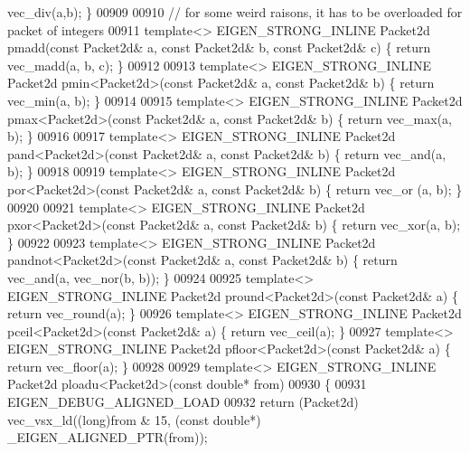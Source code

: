 \begin{DoxyCode}
{      vec\_div(a,b); \}
00909 
00910 \textcolor{comment}{// for some weird raisons, it has to be overloaded for packet of integers}
00911 \textcolor{keyword}{template}<> EIGEN\_STRONG\_INLINE Packet2d pmadd(\textcolor{keyword}{const} Packet2d& a, \textcolor{keyword}{const} Packet2d& b, \textcolor{keyword}{const} Packet2d& c) \{ \textcolor{keywordflow}{
      return} vec\_madd(a, b, c); \}
00912 
00913 \textcolor{keyword}{template}<> EIGEN\_STRONG\_INLINE Packet2d pmin<Packet2d>(\textcolor{keyword}{const} Packet2d& a, \textcolor{keyword}{const} Packet2d& b) \{ \textcolor{keywordflow}{return} 
      vec\_min(a, b); \}
00914 
00915 \textcolor{keyword}{template}<> EIGEN\_STRONG\_INLINE Packet2d pmax<Packet2d>(\textcolor{keyword}{const} Packet2d& a, \textcolor{keyword}{const} Packet2d& b) \{ \textcolor{keywordflow}{return} 
      vec\_max(a, b); \}
00916 
00917 \textcolor{keyword}{template}<> EIGEN\_STRONG\_INLINE Packet2d pand<Packet2d>(\textcolor{keyword}{const} Packet2d& a, \textcolor{keyword}{const} Packet2d& b) \{ \textcolor{keywordflow}{return} 
      vec\_and(a, b); \}
00918 
00919 \textcolor{keyword}{template}<> EIGEN\_STRONG\_INLINE Packet2d por<Packet2d>(\textcolor{keyword}{const} Packet2d& a, \textcolor{keyword}{const} Packet2d& b) \{ \textcolor{keywordflow}{return} vec\_or
      (a, b); \}
00920 
00921 \textcolor{keyword}{template}<> EIGEN\_STRONG\_INLINE Packet2d pxor<Packet2d>(\textcolor{keyword}{const} Packet2d& a, \textcolor{keyword}{const} Packet2d& b) \{ \textcolor{keywordflow}{return} 
      vec\_xor(a, b); \}
00922 
00923 \textcolor{keyword}{template}<> EIGEN\_STRONG\_INLINE Packet2d pandnot<Packet2d>(\textcolor{keyword}{const} Packet2d& a, \textcolor{keyword}{const} Packet2d& b) \{ \textcolor{keywordflow}{return} 
      vec\_and(a, vec\_nor(b, b)); \}
00924 
00925 \textcolor{keyword}{template}<> EIGEN\_STRONG\_INLINE Packet2d pround<Packet2d>(\textcolor{keyword}{const} Packet2d& a) \{ \textcolor{keywordflow}{return} vec\_round(a); \}
00926 \textcolor{keyword}{template}<> EIGEN\_STRONG\_INLINE Packet2d pceil<Packet2d>(\textcolor{keyword}{const}  Packet2d& a) \{ \textcolor{keywordflow}{return} vec\_ceil(a); \}
00927 \textcolor{keyword}{template}<> EIGEN\_STRONG\_INLINE Packet2d pfloor<Packet2d>(\textcolor{keyword}{const} Packet2d& a) \{ \textcolor{keywordflow}{return} vec\_floor(a); \}
00928 
00929 \textcolor{keyword}{template}<> EIGEN\_STRONG\_INLINE Packet2d ploadu<Packet2d>(\textcolor{keyword}{const} \textcolor{keywordtype}{double}* from)
00930 \{
00931   EIGEN\_DEBUG\_ALIGNED\_LOAD
00932   \textcolor{keywordflow}{return} (Packet2d) vec\_vsx\_ld((\textcolor{keywordtype}{long})from & 15, (\textcolor{keyword}{const} \textcolor{keywordtype}{double}*) \_EIGEN\_ALIGNED\_PTR(from));
}
\end{DoxyCode}
